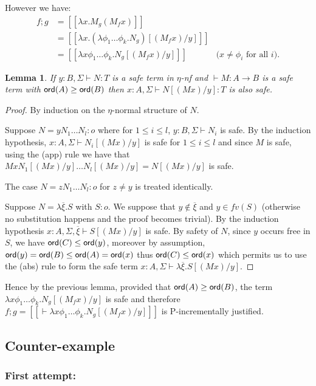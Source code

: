\documentclass{article}
\newcommand{\sem}[1]{{[\![ #1 ]\!]}}
\newcommand{\ord}[1]{{\sf ord}(#1)}
\newtheorem{lemma}{Lemma}[section]
\theoremstyle{remark}
\theoremstyle{definition}
\begin{document}
However we have:
\begin{align*}
f;g &= \sem{\lambda x . M_g (M_f x)} \\
 &= \sem{\lambda x . (\lambda \phi_1\ldots \phi_k . N_g) [(M_f x) / y]} \\
&= \sem{\lambda x \phi_1 \dots \phi_k. N_g [(M_f x) / y]}
& \mbox{($x\neq\phi_i$ for all $i$)}.
\end{align*}

\begin{lemma}
If $y:B, \Sigma \vdash N : T$ is a safe term in $\eta$-nf
and $\vdash M : A \rightarrow B$ is a safe term with $\ord{A} \geq \ord{B}$
then $x:A, \Sigma \vdash N[(M x)/y] :T$ is also safe.
\end{lemma}
\begin{proof}
By induction on the $\eta$-normal structure of $N$.

Suppose $N= y N_1 \dots N_l :o$ where  for $1\leq i \leq l$, $y:B, \Sigma \vdash N_i$ is safe.
By the induction hypothesis, $x:A, \Sigma \vdash N_i[(M x)/y]$ is safe for $1\leq i \leq l$ and since $M$ is safe, using the (app) rule we have that
$M x N_1[(M x)/y] \dots N_l[(M x)/y] = N[(M x)/y]$ is safe.

The case $N= z N_1 \dots N_l :o$ for $z\neq y$ is treated identically.

Suppose $N =\lambda \overline{\xi} . S$ with $S:o$. We suppose that
$y\notin  \overline{\xi}$ and $y\in fv(S)$ (otherwise no substitution happens
and the proof becomes trivial).
By the induction hypothesis
$x:A,\Sigma, \overline{\xi} \vdash S [(M x)/y]$ is safe.
By safety of $N$, since $y$ occurs free in $S$, we have
$\ord{C} \leq \ord{y}$, moreover by assumption, $\ord{y} = \ord{B} \leq \ord{A} = \ord{x}$ thus $\ord{C} \leq \ord{x}$ which permits us to use the (abs) rule
to form the safe term $x:A,\Sigma \vdash \lambda \overline{\xi} . S [(M x)/y]$.
\end{proof}

Hence by the previous lemma, provided that $\ord{A}\geq\ord{B}$, the term  $\lambda x \phi_1 \dots \phi_k. N_g [(M_f x) / y]$ is safe and therefore $f;g = \sem{\vdash \lambda x \phi_1 \dots \phi_k. N_g [(M_f x) / y]}$ is P-incrementally justified.


\subsection{Counter-example}
\subsubsection{First attempt:}
\end{document}
